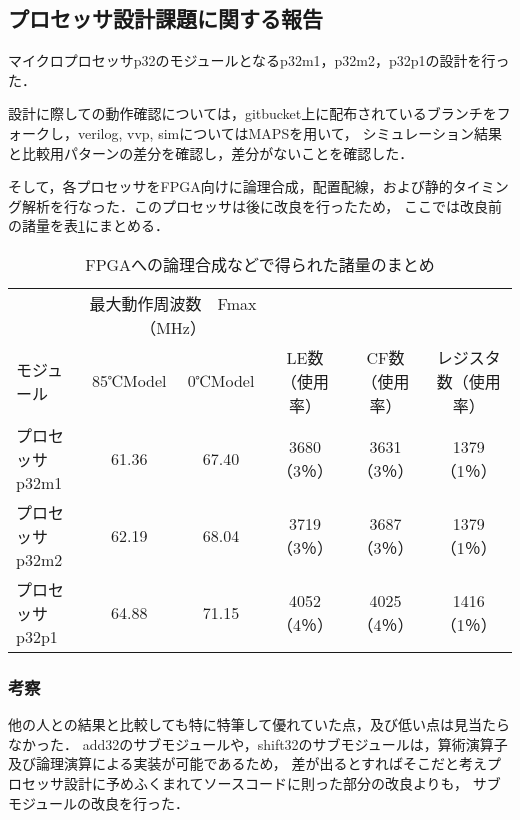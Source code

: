 \documentclass{jarticle}[11pt]
\begin{document}
  \subsection{プロセッサ設計課題に関する報告}

  マイクロプロセッサp32のモジュールとなるp32m1，p32m2，p32p1の設計を行った．

  設計に際しての動作確認については，gitbucket上に配布されているブランチをフォークし，verilog, vvp, simについてはMAPSを用いて，
  シミュレーション結果と比較用パターンの差分を確認し，差分がないことを確認した．

  そして，各プロセッサをFPGA向けに論理合成，配置配線，および静的タイミング解析を行なった．このプロセッサは後に改良を行ったため，
  ここでは改良前の諸量を表\ref{FPGAへの論理合成などで得られた諸量のまとめ}にまとめる．

  \begin{table}[h]
    \caption{FPGAへの論理合成などで得られた諸量のまとめ}
    \label{FPGAへの論理合成などで得られた諸量のまとめ}
    \begin{tabular}{l|ccccc}
      \hline \hline
               & \multicolumn{2}{c}{最大動作周波数　Fmax（MHz）} &          &          &            \\
      モジュール      & 85℃Model       & 0℃Model       & LE数（使用率） & CF数（使用率） & レジスタ数（使用率） \\ \hline
      プロセッサp32m1 & 61.36           & 67.40          & 3680（3％）   & 3631（3％）    & 1379（1％）         \\
      プロセッサp32m2 & 62.19           & 68.04          & 3719（3％）   & 3687（3％）    & 1379（1％）           \\
      プロセッサp32p1 & 64.88           & 71.15          & 4052（4％）   & 4025（4％）    & 1416（1％）            \\ \hline
    \end{tabular}
  \end{table}

  \subsubsection{考察}\label{sec:考察１}
  
  他の人との結果と比較しても特に特筆して優れていた点，及び低い点は見当たらなかった．
  add32のサブモジュールや，shift32のサブモジュールは，算術演算子及び論理演算による実装が可能であるため，
  差が出るとすればそこだと考えプロセッサ設計に予めふくまれてソースコードに則った部分の改良よりも，
  サブモジュールの改良を行った．
\end{document}
